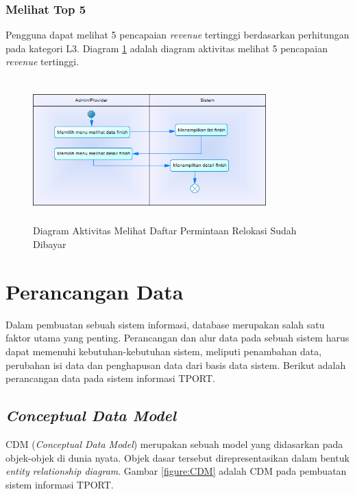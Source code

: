 \subsubsection{Melihat Top 5}
Pengguna dapat melihat 5 pencapaian \textit{revenue} tertinggi berdasarkan perhitungan pada kategori L3. Diagram \ref{figure:activity_melihat_finish} adalah diagram aktivitas melihat 5 pencapaian \textit{revenue} tertinggi.

\begin{figure}[h]
	\centerline {\includegraphics[width=9cm,height=5.5cm]{bab4/ActivityDiagram_MelihatFinish.png}}
	\caption{Diagram Aktivitas Melihat Daftar Permintaan Relokasi Sudah Dibayar}
	\label{figure:activity_melihat_finish}
\end{figure}
	
\newpage
\section{Perancangan Data}
\tab Dalam pembuatan sebuah sistem informasi, database merupakan salah satu faktor utama yang penting. Perancangan dan alur data pada sebuah sistem harus dapat memenuhi kebutuhan-kebutuhan sistem, meliputi penambahan data, perubahan isi data dan penghapusan data dari basis data sistem. Berikut adalah perancangan data pada sistem informasi TPORT.

\subsection{\textit{Conceptual Data Model}}
CDM (\textit{Conceptual Data Model}) merupakan sebuah model yang didasarkan pada objek-objek di dunia nyata. Objek dasar tersebut direpresentasikan dalam bentuk \textit{entity relationship diagram}. Gambar \ref{figure:CDM} adalah CDM pada pembuatan sistem informasi TPORT.

